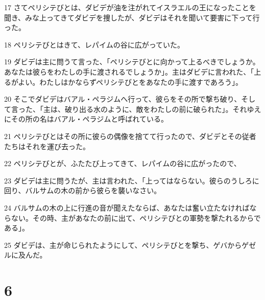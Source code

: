 \par 17 さてペリシテびとは、ダビデが油を注がれてイスラエルの王になったことを聞き、みな上ってきてダビデを捜したが、ダビデはそれを聞いて要害に下って行った。
\par 18 ペリシテびとはきて、レパイムの谷に広がっていた。
\par 19 ダビデは主に問うて言った、「ペリシテびとに向かって上るべきでしょうか。あなたは彼らをわたしの手に渡されるでしょうか」。主はダビデに言われた、「上るがよい。わたしはかならずペリシテびとをあなたの手に渡すであろう」。
\par 20 そこでダビデはバアル・ペラジムへ行って、彼らをその所で撃ち破り、そして言った、「主は、破り出る水のように、敵をわたしの前に破られた」。それゆえにその所の名はバアル・ペラジムと呼ばれている。
\par 21 ペリシテびとはその所に彼らの偶像を捨てて行ったので、ダビデとその従者たちはそれを運び去った。
\par 22 ペリシテびとが、ふたたび上ってきて、レパイムの谷に広がったので、
\par 23 ダビデは主に問うたが、主は言われた、「上ってはならない。彼らのうしろに回り、バルサムの木の前から彼らを襲いなさい。
\par 24 バルサムの木の上に行進の音が聞えたならば、あなたは奮い立たなければならない。その時、主があなたの前に出て、ペリシテびとの軍勢を撃たれるからである」。
\par 25 ダビデは、主が命じられたようにして、ペリシテびとを撃ち、ゲバからゲゼルに及んだ。

\chapter{6}


